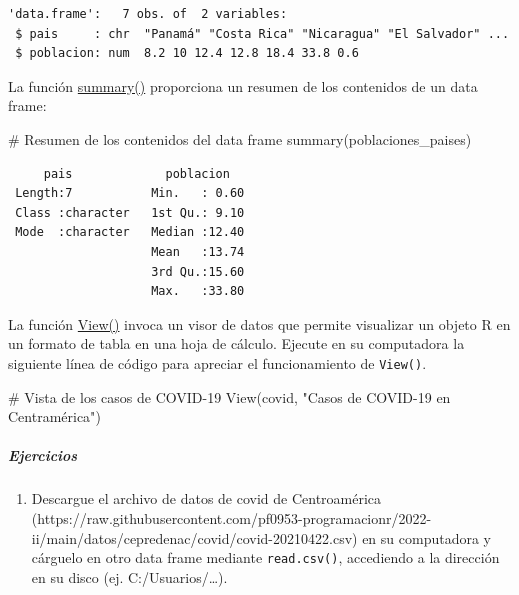 \documentclass[
  letterpaper,
  DIV=11,
  numbers=noendperiod]{scrreprt}
\let\oldsubparagraph\subparagraph
\renewcommand{\subparagraph}[1]{\oldsubparagraph{#1}\mbox{}}
\newenvironment{Shaded}{\begin{snugshade}}{\end{snugshade}}
\newcommand{\CommentTok}[1]{\textcolor[rgb]{0.37,0.37,0.37}{#1}}
\newcommand{\FunctionTok}[1]{\textcolor[rgb]{0.28,0.35,0.67}{#1}}
\newcommand{\NormalTok}[1]{\textcolor[rgb]{0.00,0.23,0.31}{#1}}
\newcommand{\StringTok}[1]{\textcolor[rgb]{0.13,0.47,0.30}{#1}}
\providecommand{\tightlist}{%
  \setlength{\itemsep}{0pt}\setlength{\parskip}{0pt}}\usepackage{longtable,booktabs,array}
\begin{document}
\begin{verbatim}
'data.frame':   7 obs. of  2 variables:
 $ pais     : chr  "Panamá" "Costa Rica" "Nicaragua" "El Salvador" ...
 $ poblacion: num  8.2 10 12.4 12.8 18.4 33.8 0.6
\end{verbatim}

La función \href{https://rdrr.io/r/base/summary.html}{summary()}
proporciona un resumen de los contenidos de un data frame:

\begin{Shaded}
\begin{Highlighting}[]
\CommentTok{\# Resumen de los contenidos del data frame}
\FunctionTok{summary}\NormalTok{(poblaciones\_paises)}
\end{Highlighting}
\end{Shaded}

\begin{verbatim}
     pais             poblacion    
 Length:7           Min.   : 0.60  
 Class :character   1st Qu.: 9.10  
 Mode  :character   Median :12.40  
                    Mean   :13.74  
                    3rd Qu.:15.60  
                    Max.   :33.80  
\end{verbatim}

La función \href{https://rdrr.io/r/utils/View.html}{View()} invoca un
visor de datos que permite visualizar un objeto R en un formato de tabla
en una hoja de cálculo. Ejecute en su computadora la siguiente línea de
código para apreciar el funcionamiento de \texttt{View()}.

\begin{Shaded}
\begin{Highlighting}[]
\CommentTok{\# Vista de los casos de COVID{-}19}
\FunctionTok{View}\NormalTok{(covid, }\StringTok{"Casos de COVID{-}19 en Centramérica"}\NormalTok{)}
\end{Highlighting}
\end{Shaded}

\hypertarget{ejercicios-4}{%
\subparagraph{Ejercicios}\label{ejercicios-4}}

\begin{enumerate}
\def\labelenumi{\arabic{enumi}.}
\tightlist
\item
  Descargue el archivo de datos de covid de Centroamérica
  (https://raw.githubusercontent.com/pf0953-programacionr/2022-ii/main/datos/cepredenac/covid/covid-20210422.csv)
  en su computadora y cárguelo en otro data frame mediante
  \texttt{read.csv()}, accediendo a la dirección en su disco (ej.
  C:/Usuarios/\ldots).
\end{enumerate}
\end{document}
